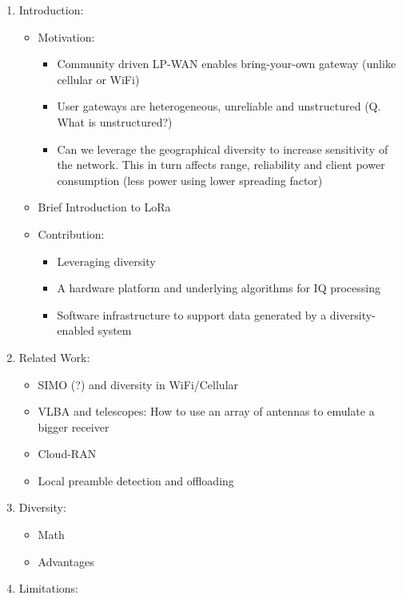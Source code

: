 \begin{enumerate}
    \item Introduction:
        \begin{itemize}
            \item Motivation:
                \begin{itemize}
                    \item Community driven LP-WAN enables bring-your-own gateway (unlike cellular or WiFi)
                    \item User gateways are heterogeneous, unreliable and unstructured (Q. What is unstructured?)
                    \item Can we leverage the geographical diversity to increase sensitivity of the network. This in turn affects range, reliability and client power consumption (less power using lower spreading factor)
                \end{itemize}
            \item Brief Introduction to LoRa
            \item Contribution:
                \begin{itemize}
                    \item Leveraging diversity
                    \item A hardware platform and underlying algorithms for IQ processing
                    \item Software infrastructure to support data generated by a diversity-enabled system
                \end{itemize}
        \end{itemize}
    \item Related Work:
        \begin{itemize}
            \item SIMO (?) and diversity in WiFi/Cellular
            \item VLBA and telescopes: How to use an array of antennas to emulate a bigger receiver
            \item Cloud-RAN
            \item Local preamble detection and offloading
        \end{itemize}
    \item Diversity:
        \begin{itemize}
            \item Math
            \item Advantages
        \end{itemize}
        \item Limitations:

\end{enumerate}
